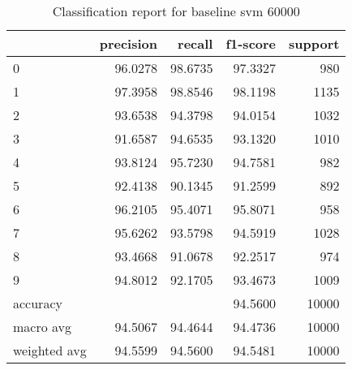 \begin{table}[htb!]
\centering
\begin{tabular}{lrrrr}
    \toprule
    & precision & recall & f1-score & support \\
    \midrule
    0 & 96.0278 & 98.6735 & 97.3327 & 980 \\
    1 & 97.3958 & 98.8546 & 98.1198 & 1135 \\
    2 & 93.6538 & 94.3798 & 94.0154 & 1032 \\
    3 & 91.6587 & 94.6535 & 93.1320 & 1010 \\
    4 & 93.8124 & 95.7230 & 94.7581 & 982 \\
    5 & 92.4138 & 90.1345 & 91.2599 & 892 \\
    6 & 96.2105 & 95.4071 & 95.8071 & 958 \\
    7 & 95.6262 & 93.5798 & 94.5919 & 1028 \\
    8 & 93.4668 & 91.0678 & 92.2517 & 974 \\
    9 & 94.8012 & 92.1705 & 93.4673 & 1009 \\
    accuracy & & & 94.5600 & 10000\\
    macro avg & 94.5067 & 94.4644 & 94.4736 & 10000 \\
    weighted avg & 94.5599 & 94.5600 & 94.5481 & 10000 \\
    \bottomrule
\end{tabular}
\caption{Classification report for baseline svm 60000}
\label{tab:classification-report-baseline_svm_60000}
\end{table}
